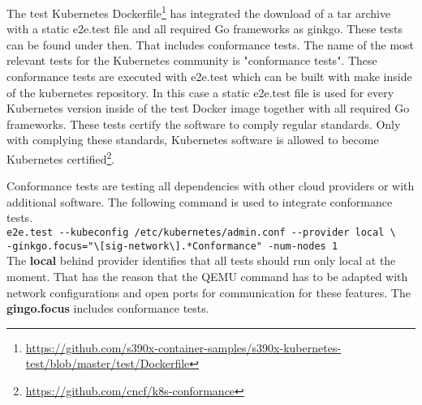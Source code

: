 The test Kubernetes Dockerfile\footnote{\url{https://github.com/s390x-container-samples/s390x-kubernetes-test/blob/master/test/Dockerfile}} has integrated the download of a tar archive with a static e2e.test file and all required Go frameworks as ginkgo.
These tests can be found under  then. That includes conformance tests.
The name of the most relevant tests for the Kubernetes community is "conformance tests". These conformance tests are executed with e2e.test  which can be built with make inside of the kubernetes repository. 
In this case a static e2e.test file is used for every Kubernetes version inside of the test Docker image together with all required Go frameworks. These tests certify the software to comply regular standards. Only with complying these standards, Kubernetes software is allowed to become Kubernetes certified\footnote{\url{https://github.com/cncf/k8s-conformance}}. 

Conformance tests are testing all dependencies with other cloud providers or with additional software. The following command is used to integrate conformance tests. \\
\verb+e2e.test --kubeconfig /etc/kubernetes/admin.conf --provider local \+ \\
\verb+-ginkgo.focus="\[sig-network\].*Conformance" -num-nodes 1+  \\
The \textbf{local} behind provider identifies that all tests should run only local at the moment. That has the reason that the \gls{QEMU} command has to be adapted with network configurations and open ports for communication for these features.
The \textbf{gingo.focus} includes conformance tests.


